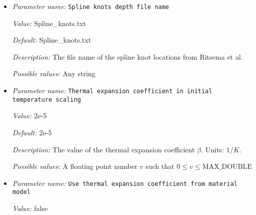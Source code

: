 \begin{itemize}
{\it Value:} false


{\it Default:} false


{\it Description:} Option to use a lower maximum order when reading the data file of spherical harmonic coefficients. This is probably used for the faster tests or when the users only want to see the spherical harmonic pattern up to a certain order.


{\it Possible values:} A boolean value (true or false)
\item {\it Parameter name:} {\tt Spline knots depth file name}
\label{parameters:Initial temperature model/S40RTS perturbation/Spline knots depth file name}


{\it Value:} Spline\_knots.txt


{\it Default:} Spline\_knots.txt


{\it Description:} The file name of the spline knot locations from Ritsema et al.


{\it Possible values:} Any string
\item {\it Parameter name:} {\tt Thermal expansion coefficient in initial temperature scaling}
\label{parameters:Initial temperature model/S40RTS perturbation/Thermal expansion coefficient in initial temperature scaling}


{\it Value:} 2e-5


{\it Default:} 2e-5


{\it Description:} The value of the thermal expansion coefficient $\beta$. Units: $1/K$.


{\it Possible values:} A floating point number $v$ such that $0 \leq v \leq \text{MAX\_DOUBLE}$
\item {\it Parameter name:} {\tt Use thermal expansion coefficient from material model}
\label{parameters:Initial temperature model/S40RTS perturbation/Use thermal expansion coefficient from material model}


{\it Value:} false



\end{itemize}
